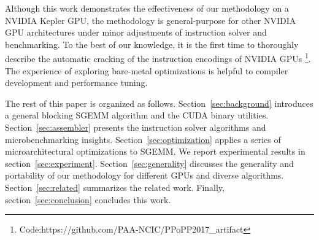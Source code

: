 Although this work demonstrates the effectiveness of our methodology on a NVIDIA Kepler GPU, the methodology is general-purpose for 
other NVIDIA GPU architectures under minor adjustments of instruction solver and benchmarking. 
To the best of our knowledge, it is the first time to thoroughly describe the automatic cracking of the instruction encodings of NVIDIA GPUs
\footnote{\scriptsize{Code:https://github.com/PAA-NCIC/PPoPP2017\_artifact}}. 
The experience of 
exploring bare-metal optimizations is helpful to compiler development and performance tuning.

The rest of this paper is organized as follows. Section~\ref{sec:background} introduces 
a general blocking SGEMM algorithm and the CUDA binary utilities.
Section~\ref{sec:assembler} presents the instruction solver algorithms and
microbenchmarking 
insights. Section~\ref{sec:optimization} applies a series of microarchitectural optimizations to SGEMM. We report 
experimental results in section~\ref{sec:experiment}.
Section~\ref{sec:generality} discusses the generality and portability of our methodology for different GPUs and diverse algorithms.
Section~\ref{sec:related} summarizes the related work. Finally, 
section~\ref{sec:conclusion} concludes this work. 
